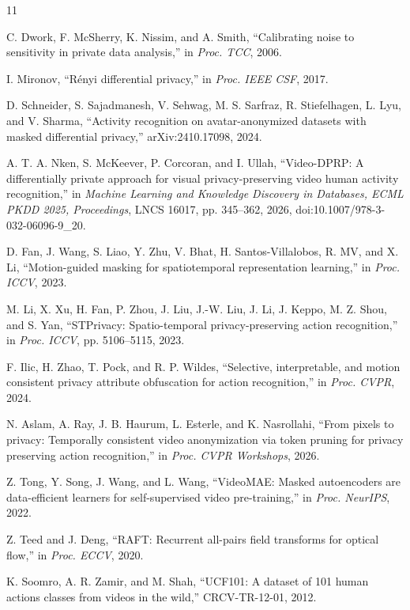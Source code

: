 \clearpage

\begin{thebibliography}{11}

C. Dwork, F. McSherry, K. Nissim, and A. Smith, ``Calibrating noise to
sensitivity in private data analysis,'' in \emph{Proc. TCC}, 2006.

I. Mironov, ``R\'enyi differential privacy,'' in \emph{Proc. IEEE CSF}, 2017.

D. Schneider, S. Sajadmanesh, V. Sehwag, M. S. Sarfraz, R. Stiefelhagen,
L. Lyu, and V. Sharma, ``Activity recognition on avatar-anonymized datasets
with masked differential privacy,'' arXiv:2410.17098, 2024.

A. T. A. Nken, S. McKeever, P. Corcoran, and I. Ullah, ``Video-DPRP: A
differentially private approach for visual privacy-preserving video human
activity recognition,'' in \emph{Machine Learning and Knowledge Discovery in
Databases, ECML PKDD 2025, Proceedings}, LNCS 16017, pp. 345--362, 2026,
doi:10.1007/978-3-032-06096-9\_20.

D. Fan, J. Wang, S. Liao, Y. Zhu, V. Bhat, H. Santos-Villalobos, R. MV, and
X. Li, ``Motion-guided masking for spatiotemporal representation learning,''
in \emph{Proc. ICCV}, 2023.

M. Li, X. Xu, H. Fan, P. Zhou, J. Liu, J.-W. Liu, J. Li, J. Keppo,
M. Z. Shou, and S. Yan, ``STPrivacy: Spatio-temporal privacy-preserving action
recognition,'' in \emph{Proc. ICCV}, pp. 5106--5115, 2023.

F. Ilic, H. Zhao, T. Pock, and R. P. Wildes, ``Selective, interpretable, and
motion consistent privacy attribute obfuscation for action recognition,'' in
\emph{Proc. CVPR}, 2024.

N. Aslam, A. Ray, J. B. Haurum, L. Esterle, and K. Nasrollahi, ``From pixels
to privacy: Temporally consistent video anonymization via token pruning for
privacy preserving action recognition,'' in \emph{Proc. CVPR Workshops}, 2026.

Z. Tong, Y. Song, J. Wang, and L. Wang, ``VideoMAE: Masked autoencoders are
data-efficient learners for self-supervised video pre-training,'' in
\emph{Proc. NeurIPS}, 2022.

Z. Teed and J. Deng, ``RAFT: Recurrent all-pairs field transforms for optical
flow,'' in \emph{Proc. ECCV}, 2020.

K. Soomro, A. R. Zamir, and M. Shah, ``UCF101: A dataset of 101 human actions
classes from videos in the wild,'' CRCV-TR-12-01, 2012.

\end{thebibliography}
